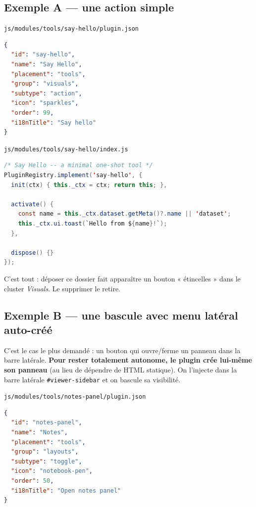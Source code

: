 \documentclass[11pt,a4paper]{article}
\newcommand{\code}[1]{\texttt{#1}}
\newcommand{\filepath}[1]{\texttt{\small #1}}
\begin{document}
\subsection{Exemple A --- une action simple}

\filepath{js/modules/tools/say-hello/plugin.json}
\begin{lstlisting}[language=json]
{
  "id": "say-hello",
  "name": "Say Hello",
  "placement": "tools",
  "group": "visuals",
  "subtype": "action",
  "icon": "sparkles",
  "order": 99,
  "i18nTitle": "Say hello"
}
\end{lstlisting}

\filepath{js/modules/tools/say-hello/index.js}
\begin{lstlisting}[language=Java]
/* Say Hello -- a minimal one-shot tool */
PluginRegistry.implement('say-hello', {
  init(ctx) { this._ctx = ctx; return this; },

  activate() {
    const name = this._ctx.dataset.getMeta()?.name || 'dataset';
    this._ctx.ui.toast(`Hello from ${name}!`);
  },

  dispose() {}
});
\end{lstlisting}

C'est tout : déposer ce dossier fait apparaître un bouton « étincelles » dans le
cluster \emph{Visuals}. Le supprimer le retire.

\subsection{Exemple B --- une bascule avec menu latéral auto-créé}

C'est le cas le plus demandé : un bouton qui ouvre/ferme un panneau dans la barre
latérale. \textbf{Pour rester totalement autonome, le plugin crée lui-même son
panneau} (au lieu de dépendre de HTML statique). On l'injecte dans la barre
latérale \code{\#viewer-sidebar} et on bascule sa visibilité.

\filepath{js/modules/tools/notes-panel/plugin.json}
\begin{lstlisting}[language=json]
{
  "id": "notes-panel",
  "name": "Notes",
  "placement": "tools",
  "group": "layouts",
  "subtype": "toggle",
  "icon": "notebook-pen",
  "order": 50,
  "i18nTitle": "Open notes panel"
}
\end{lstlisting}
\end{document}
